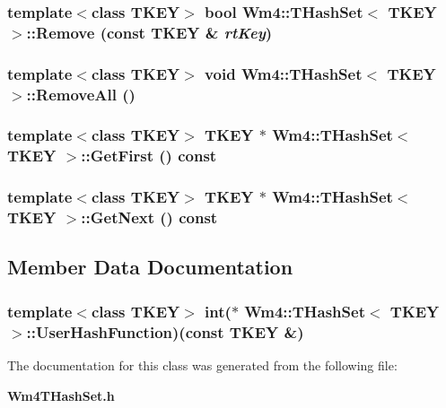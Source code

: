 \subsubsection{\setlength{\rightskip}{0pt plus 5cm}template$<$class TKEY$>$ bool {\bf Wm4::THash\-Set}$<$ TKEY $>$::Remove (const TKEY \& {\em rt\-Key})}\label{classWm4_1_1THashSet_88cdbe4cc424966638039b39dbc36496}


\subsubsection{\setlength{\rightskip}{0pt plus 5cm}template$<$class TKEY$>$ void {\bf Wm4::THash\-Set}$<$ TKEY $>$::Remove\-All ()}\label{classWm4_1_1THashSet_53a7a9ebdce75104b13138c7fb8d46ac}


\subsubsection{\setlength{\rightskip}{0pt plus 5cm}template$<$class TKEY$>$ TKEY $\ast$ {\bf Wm4::THash\-Set}$<$ TKEY $>$::Get\-First () const}\label{classWm4_1_1THashSet_e7f96b7c1616e865c15a62ff88c5930c}


\subsubsection{\setlength{\rightskip}{0pt plus 5cm}template$<$class TKEY$>$ TKEY $\ast$ {\bf Wm4::THash\-Set}$<$ TKEY $>$::Get\-Next () const}\label{classWm4_1_1THashSet_e8f33238a1445c6b7771ef885d226c23}




\subsection{Member Data Documentation}
\subsubsection{\setlength{\rightskip}{0pt plus 5cm}template$<$class TKEY$>$ int($\ast$ {\bf Wm4::THash\-Set}$<$ TKEY $>$::{\bf User\-Hash\-Function})(const TKEY \&)}\label{classWm4_1_1THashSet_35bc900f3b6e2ede7c27e5eef3046142}




The documentation for this class was generated from the following file:\begin{CompactItemize}
\item 
{\bf Wm4THash\-Set.h}\end{CompactItemize}
